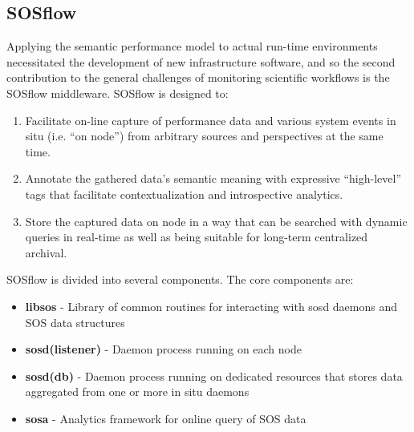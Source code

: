 \subsection{SOSflow}
Applying the semantic performance model to actual run-time
environments necessitated the development of new infrastructure
software, and so the second contribution to the general challenges of
monitoring scientific workflows is the SOSflow middleware.
%
SOSflow is designed to:
%
\begin{enumerate}
    \item Facilitate on-line capture of performance data and various system
      events in situ (i.e. ``on node'') from arbitrary sources and
      perspectives at the same time.
    \item Annotate the gathered data's semantic meaning with
      expressive ``high-level'' tags that facilitate contextualization
      and introspective analytics.
    \item Store the captured data on node in a way that can be
      searched with dynamic queries in real-time as well as being
      suitable for long-term centralized archival.
\end{enumerate}

SOSflow is divided into several components.  The core components are:
%
\begin{itemize}
    \item \textbf{libsos} - Library of common routines for interacting with
      sosd daemons and SOS data structures
    \item \textbf{sosd(listener)} - Daemon process running on each node
    \item \textbf{sosd(db)} - Daemon process running on dedicated resources
      that stores data aggregated from one or more in situ daemons
    \item \textbf{sosa} - Analytics framework for online query of SOS data
\end{itemize}

